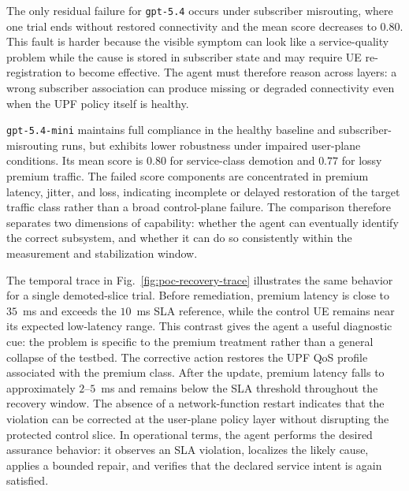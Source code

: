 The only residual failure for \texttt{gpt-5.4} occurs under subscriber
misrouting, where one trial ends without restored connectivity and the mean
score decreases to $0.80$. This fault is harder because the visible symptom can
look like a service-quality problem while the cause is stored in subscriber
state and may require UE re-registration to become effective. The agent must
therefore reason across layers: a wrong subscriber association can produce
missing or degraded connectivity even when the UPF policy itself is healthy.

\texttt{gpt-5.4-mini} maintains full compliance in the healthy baseline and
subscriber-misrouting runs, but exhibits lower robustness under impaired
user-plane conditions. Its mean score is $0.80$ for service-class demotion and
$0.77$ for lossy premium traffic. The failed score components are concentrated
in premium latency, jitter, and loss, indicating incomplete or delayed
restoration of the target traffic class rather than a broad control-plane
failure. The comparison therefore separates two dimensions of capability:
whether the agent can eventually identify the correct subsystem, and whether it
can do so consistently within the measurement and stabilization window.

The temporal trace in Fig.~\ref{fig:poc-recovery-trace} illustrates the same
behavior for a single demoted-slice trial. Before remediation, premium latency
is close to $35$~ms and exceeds the $10$~ms SLA reference, while the control UE
remains near its expected low-latency range. This contrast gives the agent a
useful diagnostic cue: the problem is specific to the premium treatment rather
than a general collapse of the testbed. The corrective action restores the UPF
QoS profile associated with the premium class. After the update, premium
latency falls to approximately $2$--$5$~ms and remains below the SLA threshold
throughout the recovery window. The absence of a network-function restart
indicates that the violation can be corrected at the user-plane policy layer
without disrupting the protected control slice. In operational terms, the
agent performs the desired assurance behavior: it observes an SLA violation,
localizes the likely cause, applies a bounded repair, and verifies that the
declared service intent is again satisfied.
